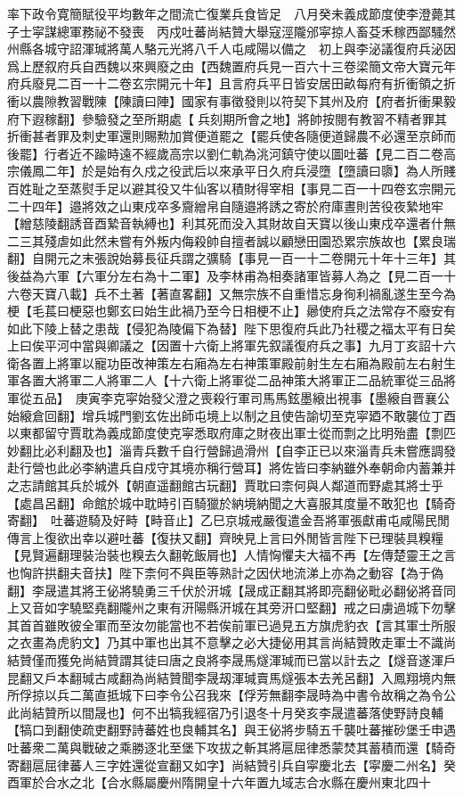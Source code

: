 率下政令寛簡賦役平均數年之間流亡復業兵食皆足　八月癸未義成節度使李澄薨其子士寜謀總軍務祕不發喪　丙戍吐蕃尚結贊大舉寇涇隴邠寜掠人畜芟禾稼西鄙騷然州縣各城守詔渾瑊將萬人駱元光將八千人屯咸陽以備之　初上與李泌議復府兵泌因爲上歷叙府兵自西魏以來興廢之由【西魏置府兵見一百六十三卷梁簡文帝大寶元年府兵廢見二百一十二卷玄宗開元十年】且言府兵平日皆安居田畝每府有折衝領之折衝以農隙教習戰陳【陳讀曰陣】國家有事徵發則以符契下其州及府【府者折衝果毅府下遐稼翻】參驗發之至所期處【兵刻期所會之地】將帥按閱有教習不精者罪其折衝甚者罪及刺史軍還則賜勲加賞便道罷之【罷兵使各隨便道歸農不必還至京師而後罷】行者近不踰時遠不經歲高宗以劉仁軌為洮河鎮守使以圖吐蕃【見二百二卷高宗儀鳳二年】於是始有久戍之役武后以來承平日久府兵浸墮【墮讀曰隳】為人所賤百姓耻之至蒸熨手足以避其役又牛仙客以積財得宰相【事見二百一十四卷玄宗開元二十四年】邉將效之山東戍卒多齎繒帛自隨邉將誘之寄於府庫晝則苦役夜縶地牢【繒慈陵翻誘音酉縶音執縛也】利其死而没入其財故自天寶以後山東戍卒還者什無二三其殘虐如此然未嘗有外叛内侮殺帥自擅者誠以顧戀田園恐累宗族故也【累良瑞翻】自開元之末張說始募長征兵謂之彍騎【事見一百一十二卷開元十年十三年】其後益為六軍【六軍分左右為十二軍】及李林甫為相奏諸軍皆募人為之【見二百一十六卷天寶八載】兵不土著【著直畧翻】又無宗族不自重惜忘身徇利禍亂遂生至今為梗【毛萇曰梗惡也鄭玄曰始生此禍乃至今日相梗不止】曏使府兵之法常存不廢安有如此下陵上替之患哉【侵犯為陵偏下為替】陛下思復府兵此乃社稷之福太平有日矣上曰俟平河中當與卿議之【因置十六衛上將軍先叙議復府兵之事】九月丁亥詔十六衛各置上將軍以寵功臣改神策左右廂為左右神策軍殿前射生左右廂為殿前左右射生軍各置大將軍二人將軍二人【十六衛上將軍從二品神策大將軍正二品統軍從三品將軍從五品】　庚寅李克寜始發父澄之喪殺行軍司馬馬鉉墨縗出視事【墨縗自晋襄公始縗倉回翻】增兵城門劉玄佐出師屯境上以制之且使告諭切至克寜廼不敢襲位丁酉以東都留守賈耽為義成節度使克寜悉取府庫之財夜出軍士從而剽之比明殆盡【剽匹妙翻比必利翻及也】淄青兵數千自行營歸過滑州【自李正已以來淄青兵未嘗應調發赴行營也此必李納遣兵自戍守其境亦稱行營耳】將佐皆曰李納雖外奉朝命内蓄兼并之志請館其兵於城外【朝直遥翻館古玩翻】賈耽曰柰何與人鄰道而野處其將士乎【處昌呂翻】命館於城中耽時引百騎獵於納境納聞之大喜服其度量不敢犯也【騎奇寄翻】　吐蕃遊騎及好畤【畤音止】乙巳京城戒嚴復遣金吾將軍張獻甫屯咸陽民閒傳言上復欲出幸以避吐蕃【復扶又翻】齊映見上言曰外閒皆言陛下已理裝具糗糧【見賢遍翻理裝治裝也糗去久翻乾飯屑也】人情恟懼夫大福不再【左傳楚靈王之言也恟許拱翻夫音扶】陛下柰何不與臣等熟計之因伏地流涕上亦為之動容【為于偽翻】李晟遣其將王佖將驍勇三千伏於汧城【晟成正翻其將即亮翻佖毗必翻佖將音同上又音如字驍堅堯翻隴州之東有汧陽縣汧城在其旁汧口堅翻】戒之曰虜過城下勿擊其首首雖敗彼全軍而至汝勿能當也不若俟前軍已過見五方旗虎豹衣【言其軍士所服之衣畫為虎豹文】乃其中軍也出其不意擊之必大捷佖用其言尚結贊敗走軍士不識尚結贊僅而獲免尚結贊謂其徒曰唐之良將李晟馬燧渾瑊而已當以計去之【燧音遂渾戶昆翻又戶本翻瑊古咸翻為尚結贊聞李晟刼渾瑊賣馬燧張本去羌呂翻】入鳳翔境内無所俘掠以兵二萬直抵城下曰李令公召我來【俘芳無翻李晟時為中書令故稱之為令公此尚結贊所以間晟也】何不出犒我經宿乃引退冬十月癸亥李晟遣蕃落使野詩良輔【犒口到翻使疏吏翻野詩蕃姓也良輔其名】與王佖將步騎五千襲吐蕃摧砂堡壬申遇吐蕃衆二萬與戰破之乘勝逐北至堡下攻拔之斬其將扈屈律悉蒙焚其蓄積而還【騎奇寄翻扈屈律蕃人三字姓還從宣翻又如字】尚結贊引兵自寜慶北去【寜慶二州名】癸酉軍於合水之北【合水縣屬慶州隋開皇十六年置九域志合水縣在慶州東北四十